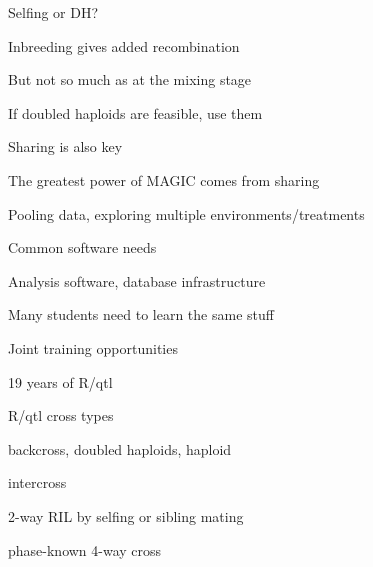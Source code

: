\documentclass[12pt,t,aspectratio=169]{beamer}
\begin{document}
\begin{frame}[c]{Selfing or DH?}

\bbi
\item Inbreeding gives added recombination
\item But not so much as at the mixing stage
\item \hilit If doubled haploids are feasible, use them
  \ei

\end{frame}




\begin{frame}[c]{Sharing is also key}

\bbi
\item The greatest power of MAGIC comes from sharing
  \bi
\item[] \hilit Pooling data, exploring multiple environments/treatments
  \ei

\item Common software needs
  \bi
\item[] \hilit Analysis software, database infrastructure
  \ei

\item Many students need to learn the same stuff
  \bi
\item[] \hilit Joint training opportunities
  \ei

  \ei

\end{frame}




\begin{frame}[c]{19 years of R/qtl}


\end{frame}




\begin{frame}{R/qtl cross types}

\bbi
\item backcross{\lolit , doubled haploids, haploid}

\item intercross

\item 2-way RIL {\lolit by selfing or sibling mating}

\item phase-known 4-way cross
\ei

\end{frame}
\end{document}
